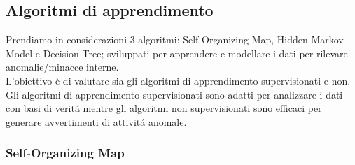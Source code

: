 \documentclass[../tesi.tex]{subfiles}
\begin{document}
\subsection{Algoritmi di apprendimento}

Prendiamo in considerazioni 3 algoritmi: Self-Organizing Map, Hidden Markov Model e Decision Tree; sviluppati per apprendere e modellare i dati per rilevare anomalie/minacce interne.\\
L’obiettivo è di valutare sia gli algoritmi di apprendimento supervisionati e non.\\
Gli algoritmi di apprendimento supervisionati sono adatti per analizzare i dati con basi di veritá mentre gli algoritmi non supervisionati sono efficaci per generare avvertimenti di attivitá anomale.

\subsubsection{Self-Organizing Map}

\end{document}

